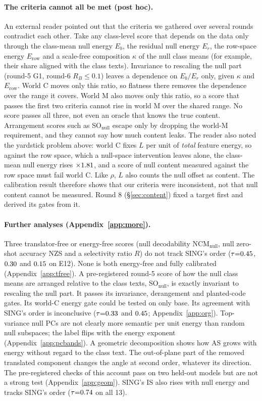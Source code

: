 \documentclass[10pt]{article}
\begin{document}
\paragraph{The criteria cannot all be met (post hoc).}
An external reader pointed out that the criteria we gathered over several rounds contradict each other. Take any class-level score that depends on the data only through the class-mean null energy $E_b$, the residual null energy $E_r$, the row-space energy $E_{\mathrm{row}}$ and a scale-free composition $\kappa$ of the null class means (for example, their share aligned with the class texts). Invariance to rescaling the null part (round-5 G1, round-6 $R_B{\le}0.1$) leaves a dependence on $E_b/E_r$ only, given $\kappa$ and $E_{\mathrm{row}}$. World C moves only this ratio, so flatness there removes the dependence over the range it covers. World M also moves only this ratio, so a score that passes the first two criteria cannot rise in world M over the shared range. No score passes all three, not even an oracle that knows the true content. Arrangement scores such as SO$_{\mathrm{null}}$ escape only by dropping the world-M requirement, and they cannot say how much content leaks.
The reader also noted the yardstick problem above: world C fixes $L$ per unit of \emph{total} feature energy, so against the row space, which a null-space intervention leaves alone, the class-mean null energy rises ${\times}1.81$, and a score of null content measured against the row space must fail world C. Like $\rho$, $L$ also counts the null offset as content.
The calibration result therefore shows that our criteria were inconsistent, not that null content cannot be measured. Round 8 (\S\ref{sec:content}) fixed a target first and derived its gates from it.

\paragraph{Further analyses (Appendix~\ref{app:more}).}
Three translator-free or energy-free scores (null decodability NCM$_{\mathrm{null}}$, null zero-shot accuracy NZS and a selectivity ratio $R$) do not track SING's order ($\tau{=}0.45$, $0.30$ and $0.15$ on E12). None is both energy-free and fully calibrated (Appendix~\ref{app:tfree}).
A pre-registered round-5 score of how the null class means are arranged relative to the class texts, SO$_{\mathrm{null}}$, is exactly invariant to rescaling the null part. It passes its invariance, derangement and planted-code gates. Its world-C energy gate could be tested on only \FSOGFourTestable{} base. Its agreement with SING's order is inconclusive ($\tau{=}0.33$ and $0.45$; Appendix~\ref{app:org}).
Top-variance null PCs are not clearly more semantic per unit energy than random null subspaces; the label flips with the energy exponent (Appendix~\ref{app:pcbands}).
A geometric decomposition shows how AS grows with energy without regard to the class text. The out-of-plane part of the removed translated component changes the angle at second order, whatever its direction. The pre-registered checks of this account pass on two held-out models but are not a strong test (Appendix~\ref{app:geom}).
SING's IS also rises with null energy and tracks SING's order ($\tau{=}0.74$ on all 13).
\end{document}
